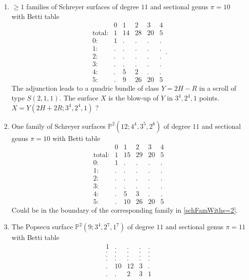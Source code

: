 \documentclass[twoside,12pt, leqno]{amsart}
\def\PP{{\mathbb P}}
\begin{document}
\begin{enumerate}
 \item $\ge 1$ families of Schreyer surfaces of  degree $11$ and sectional genus $\pi=10$ with Betti table
$$\begin{matrix}
       & 0 & 1 & 2 & 3 & 4\\
      \text{total:} & 1 & 14 & 28 & 20 & 5\\
      0: & 1 & . & . & . & .\\
      1: & . & . & . & . & .\\
      2: & . & . & . & . & .\\
      3: & . & . & . & . & .\\
      4: & . & 5 & 2 & . & .\\
      5: & . & 9 & 26 & 20 & 5
      \end{matrix}.$$
The adjunction leads to a quadric bundle of class $Y=2H-R$ in a scroll of type $S(2,1,1)$. The surface $X$ is the blow-up of $Y$ in $3^{4},2^{4},1$ points.
$X=Y(2H+2R;3^{4},2^{4},1)$ ?

 
  
  \item One family of Schreyer surfaces $\PP^{2}(12;4^{4},3^{5},2^{6})$ of  degree $11$ and sectional genus $\pi=10$ with Betti table
$$\begin{matrix}
        & 0 & 1 & 2 & 3 & 4\\
       \text{total:} & 1 & 15 & 29 & 20 & 5\\
       0: & 1 & . & . & . & .\\
       1: & . & . & . & . & .\\
       2: & . & . & . & . & .\\
       3: & . & . & . & . & .\\
       4: & . & 5 & 3 & . & .\\
       5: & . & 10 & 26 & 20 & 5
       \end{matrix}$$
Could be in the boundary of the corresponding family in \ref{schFamWiths=2}.
      
\item   The Popsecu surface $\PP^{2}(9;3^{4},2^{7},1^{7})$ of degree $11$ and sectional genus $\pi=11$ with Betti table
$$\begin{matrix}
 1 & . & . & . & .\\
 . & . & . & . & .\\
 . & . & . & . & .\\
 . & . & . & . & .\\
 . & 10 & 12 & 3 & .\\
 . & . & 2 & 3 & 1
      \end{matrix}$$


\end{enumerate}
\end{document}
